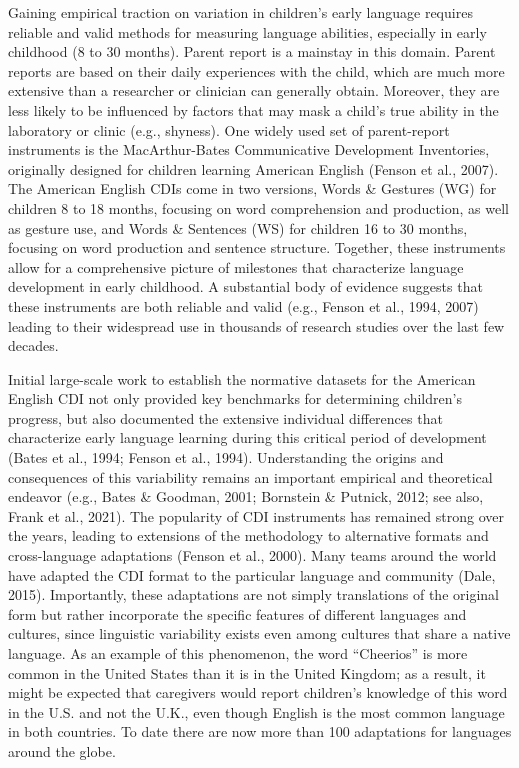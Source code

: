 \documentclass[
  english,
  ,man,floatsintext]{apa6}
\begin{document}
Gaining empirical traction on variation in children's early language requires reliable and valid methods for measuring language abilities, especially in early childhood (8 to 30 months). Parent report is a mainstay in this domain. Parent reports are based on their daily experiences with the child, which are much more extensive than a researcher or clinician can generally obtain. Moreover, they are less likely to be influenced by factors that may mask a child's true ability in the laboratory or clinic (e.g., shyness). One widely used set of parent-report instruments is the MacArthur-Bates Communicative Development Inventories, originally designed for children learning American English (Fenson et al., 2007). The American English CDIs come in two versions, Words \& Gestures (WG) for children 8 to 18 months, focusing on word comprehension and production, as well as gesture use, and Words \& Sentences (WS) for children 16 to 30 months, focusing on word production and sentence structure. Together, these instruments allow for a comprehensive picture of milestones that characterize language development in early childhood. A substantial body of evidence suggests that these instruments are both reliable and valid (e.g., Fenson et al., 1994, 2007) leading to their widespread use in thousands of research studies over the last few decades.

Initial large-scale work to establish the normative datasets for the American English CDI not only provided key benchmarks for determining children's progress, but also documented the extensive individual differences that characterize early language learning during this critical period of development (Bates et al., 1994; Fenson et al., 1994). Understanding the origins and consequences of this variability remains an important empirical and theoretical endeavor (e.g., Bates \& Goodman, 2001; Bornstein \& Putnick, 2012; see also, Frank et al., 2021). The popularity of CDI instruments has remained strong over the years, leading to extensions of the methodology to alternative formats and cross-language adaptations (Fenson et al., 2000). Many teams around the world have adapted the CDI format to the particular language and community (Dale, 2015). Importantly, these adaptations are not simply translations of the original form but rather incorporate the specific features of different languages and cultures, since linguistic variability exists even among cultures that share a native language. As an example of this phenomenon, the word \enquote{Cheerios} is more common in the United States than it is in the United Kingdom; as a result, it might be expected that caregivers would report children's knowledge of this word in the U.S. and not the U.K., even though English is the most common language in both countries. To date there are now more than 100 adaptations for languages around the globe.
\end{document}
